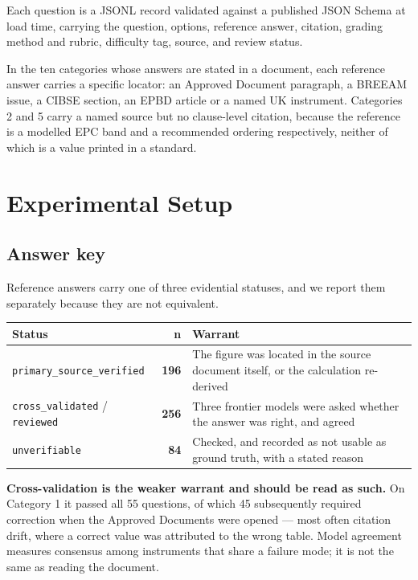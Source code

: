 \documentclass[11pt,a4paper]{article}
\begin{document}
Each question is a JSONL record validated against a published JSON Schema at load time, carrying the question, options, reference answer, citation, grading method and rubric, difficulty tag, source, and review status.

In the ten categories whose answers are stated in a document, each reference answer carries a specific locator: an Approved Document paragraph, a BREEAM issue, a CIBSE section, an EPBD article or a named UK instrument. Categories 2 and 5 carry a named source but no clause-level citation, because the reference is a modelled EPC band and a recommended ordering respectively, neither of which is a value printed in a standard.


\section{Experimental Setup}

\subsection{Answer key}

Reference answers carry one of three evidential statuses, and we report them separately because they are not equivalent.

\begin{center}
\small
\begin{tabularx}{\textwidth}{lr>{\raggedright\arraybackslash}X}
\toprule
Status & n & Warrant \\
\midrule
\texttt{primary\_source\_verified} & \textbf{196} & The figure was located in the source document itself, or the calculation re-derived \\
\texttt{cross\_validated} / \texttt{reviewed} & \textbf{256} & Three frontier models were asked whether the answer was right, and agreed \\
\texttt{unverifiable} & \textbf{84} & Checked, and recorded as not usable as ground truth, with a stated reason \\
\bottomrule
\end{tabularx}
\end{center}

\textbf{Cross-validation is the weaker warrant and should be read as such.} On Category 1 it passed all 55 questions, of which 45 subsequently required correction when the Approved Documents were opened --- most often citation drift, where a correct value was attributed to the wrong table. Model agreement measures consensus among instruments that share a failure mode; it is not the same as reading the document.
\end{document}
